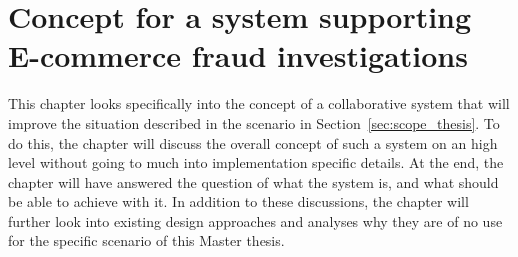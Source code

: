 
\chapter{Concept for a system supporting \gls{E-commerce} fraud investigations} %
\label{cha:system_concept}

This chapter looks specifically into the concept of a collaborative system that will improve the situation described in the scenario in Section~\ref{sec:scope_thesis}. To do this, the chapter will discuss the overall concept of such a system on an high level without going to much into implementation specific details. At the end, the chapter will have answered the question of what the system is, and what should be able to achieve with it. In addition to these discussions, the chapter will further look into existing design approaches and analyses why they are of no use for the specific scenario of this Master thesis.











